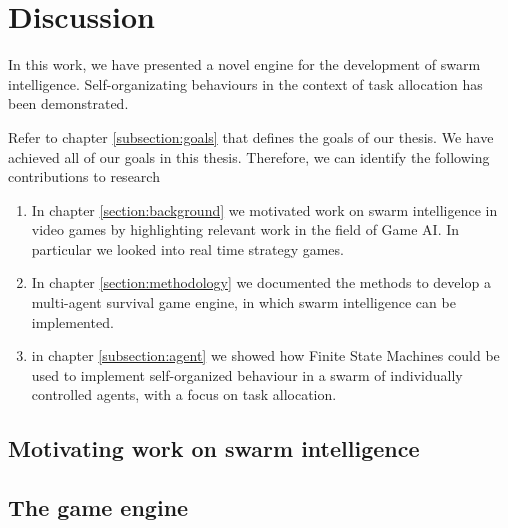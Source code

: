 \section{Discussion} \label{section:discussion}
In this work, we have presented a novel engine for the development of swarm intelligence.
Self-organizating behaviours in the context of task allocation has been demonstrated.

\textcolor{purple}{
    \blindtext
    \blindtext
}
\textcolor{purple}{
    \blindtext
    \blindtext
}

Refer to chapter \ref{subsection:goals} that defines the goals of our thesis. 
We have achieved all of our goals in this thesis. 
Therefore, we can identify the following contributions to research

\begin{enumerate}
    \item In chapter \ref{section:background} we motivated work on swarm intelligence in video games by highlighting relevant work in the field of Game AI.
    In particular we looked into real time strategy games.
    \item In chapter \ref{section:methodology} we documented the methods to develop a multi-agent survival game engine, in which swarm intelligence can be implemented.
    \item in chapter \ref{subsection:agent} we showed how Finite State Machines could be used to implement self-organized behaviour in a swarm of individually controlled agents, with a focus on task allocation.
\end{enumerate}

\subsection*{Motivating work on swarm intelligence}
\textcolor{purple}{
    \blindtext
    \blindtext
}

\subsection*{The game engine}
\textcolor{purple}{
    \blindtext
    \blindtext
}

